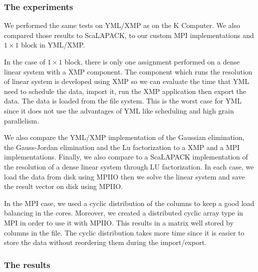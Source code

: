 \subsubsection{The experiments}
We performed the same tests on YML/XMP as on the K Computer.
We also compared those results to ScaLAPACK, to our custom MPI implementations and $1\times 1$ block in YML/XMP.

In the case of $1\times 1$ block, there is only one assignment performed on a dense linear system with a XMP component.
The component which runs the resolution of linear system is developed using XMP so we can evaluate the time that YML need to schedule the data, import it, run the XMP application then export the data.
The data is loaded from the file system.
This is the worst case for YML since it does not use the advantages of YML like scheduling and high grain parallelism.

We also compare the YML/XMP implementation of the Gaussian elimination, the Gauss-Jordan elimination and the Lu factorization to a XMP and a MPI implementations.
Finally, we also compare to a ScaLAPACK implementation of the resolution of a dense linear system through LU factorization.
In each case, we load the data from disk using MPIIO then we solve the linear system and save the result vector on disk using MPIIO.

In the MPI case, we used a cyclic distribution of the columns to keep a good load balancing in the cores.
Moreover, we created a distributed cyclic array type in MPI in order to use it with MPIIO.
This results in a matrix well stored by columns in the file.
The cyclic distribution takes more time since it is easier to store the data without reordering them during the import/export.

\subsubsection{The results}

